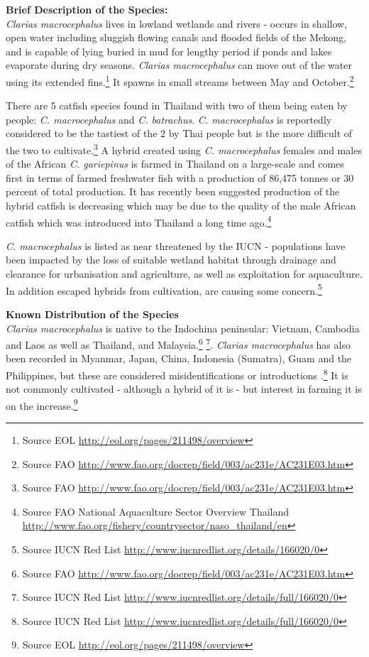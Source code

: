 \documentclass[]{book}
\let\rmarkdownfootnote\footnote%
\def\footnote{\protect\rmarkdownfootnote}
\theoremstyle{definition}
\theoremstyle{definition}
\theoremstyle{definition}
\theoremstyle{remark}
\begin{document}
\textbf{Brief Description of the Species:}\\
\emph{Clarias macrocephalus} lives in lowland wetlands and rivers -
occurs in shallow, open water including sluggish flowing canals and
flooded fields of the Mekong, and is capable of lying buried in mud for
lengthy period if ponds and lakes evaporate during dry seasons.
\emph{Clarias macrocephalus} can move out of the water using its
extended fins.\footnote{Source EOL
  \url{http://eol.org/pages/211498/overview}} It spawns in small streams
between May and October.\footnote{Source FAO
  \url{http://www.fao.org/docrep/field/003/ac231e/AC231E03.htm}}

There are 5 catfish species found in Thailand with two of them being
eaten by people: \emph{C. macrocephalus} and \emph{C. batrachus}.
\emph{C. macrocephalus} is reportedly considered to be the tastiest of
the 2 by Thai people but is the more difficult of the two to
cultivate.\footnote{Source FAO
  \url{http://www.fao.org/docrep/field/003/ac231e/AC231E03.htm}} A
hybrid created using \emph{C. macrocephalus} females and males of the
African \emph{C. gariepinus} is farmed in Thailand on a large-scale and
comes first in terms of farmed freshwater fish with a production of
86,475 tonnes or 30 percent of total production. It has recently been
suggested production of the hybrid catfish is decreasing which may be
due to the quality of the male African catfish which was introduced into
Thailand a long time ago.\footnote{Source FAO National Aquaculture
  Sector Overview Thailand
  \url{http://www.fao.org/fishery/countrysector/naso_thailand/en}}

\emph{C. macrocephalus} is listed as near threatened by the IUCN -
populations have been impacted by the loss of suitable wetland habitat
through drainage and clearance for urbanisation and agriculture, as well
as exploitation for aquaculture. In addition escaped hybrids from
cultivation, are causing some concern.\footnote{Source IUCN Red List
  \url{http://www.iucnredlist.org/details/166020/0}}

\textbf{Known Distribution of the Species}\\
\emph{Clarias macrocephalus} is native to the Indochina peninsular:
Vietnam, Cambodia and Laos as well as Thailand, and Malaysia.\footnote{Source
  FAO \url{http://www.fao.org/docrep/field/003/ac231e/AC231E03.htm}}
\footnote{Source IUCN Red List
  \url{http://www.iucnredlist.org/details/full/166020/0}}. \emph{Clarias
macrocephalus} has also been recorded in Myanmar, Japan, China,
Indonesia (Sumatra), Guam and the Philippines, but these are considered
misidentifications or introductions .\footnote{Source IUCN Red List
  \url{http://www.iucnredlist.org/details/full/166020/0}} It is not
commonly cultivated - although a hybrid of it is - but interest in
farming it is on the increase.\footnote{Source EOL
  \url{http://eol.org/pages/211498/overview}}
\end{document}
